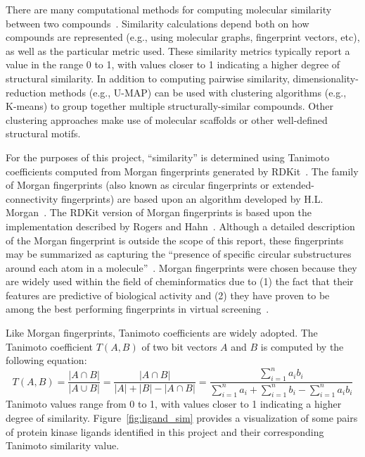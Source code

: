 \documentclass[11pt]{article}
\begin{document}
There are many computational methods for computing molecular similarity between two compounds~\cite{molsim_2024}. Similarity calculations depend both on how compounds are represented (e.g., using molecular graphs, fingerprint vectors, etc), as well as the particular metric used. These similarity metrics typically report a value in the range 0 to 1, with values closer to 1 indicating a higher degree of structural similarity. In addition to computing pairwise similarity, dimensionality-reduction methods (e.g., U-MAP) can be used with clustering algorithms (e.g., K-means) to group together multiple structurally-similar compounds. Other clustering approaches make use of molecular scaffolds or other well-defined structural motifs.

For the purposes of this project, ``similarity'' is determined using Tanimoto coefficients computed from Morgan fingerprints generated by RDKit~\cite{greg_landrum_2024_11396708}. 
The family of Morgan fingerprints (also known as circular fingerprints or extended-connectivity fingerprints) are based upon an algorithm developed by H.L. Morgan~\cite{morgan_1965}. 
The RDKit version of Morgan fingerprints is based upon the implementation described by Rogers and Hahn~\cite{rogers_hahn_2010}. 
Although a detailed description of the Morgan fingerprint is outside the scope of this report, these fingerprints may be summarized as capturing the ``presence of specific circular substructures around each atom in a molecule''~\cite{capecchi_probst_reymond_2020}. 
Morgan fingerprints were chosen because they are widely used within the field of cheminformatics due to (1) the fact that their features are predictive of biological activity and (2) they have proven to be among the best performing fingerprints in virtual screening~\cite{capecchi_probst_reymond_2020}. 

Like Morgan fingerprints, Tanimoto coefficients are widely adopted. 
The Tanimoto coefficient $T(A,B)$ of two bit vectors $A$ and $B$ is computed by the following equation:
\begin{equation}\label{eq:1}
T(A,B) = \frac{|A \cap B|}{|A \cup B|} = \frac{|A \cap B|}{|A| + |B| - |A \cap B|} = \frac{\sum_{i=1}^{n} a_i b_i}{\sum_{i=1}^{n} a_i + \sum_{i=1}^{n} b_i - \sum_{i=1}^{n} a_i b_i}
\end{equation}
\noindent
Tanimoto values range from 0 to 1, with values closer to 1 indicating a higher degree of similarity.
Figure~\ref{fig:ligand_sim} provides a visualization of some pairs of protein kinase ligands identified in this project and their corresponding Tanimoto similarity value.
\end{document}
